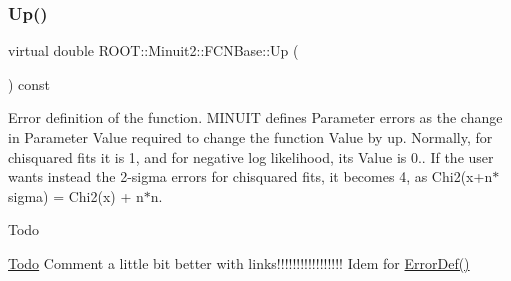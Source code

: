 \subsubsection{\texorpdfstring{Up()}{Up()}\hspace{0.1cm}{\footnotesize\ttfamily [1/3]}}
{\footnotesize\ttfamily virtual double R\+O\+O\+T\+::\+Minuit2\+::\+F\+C\+N\+Base\+::\+Up (\begin{DoxyParamCaption}{ }\end{DoxyParamCaption}) const\hspace{0.3cm}{\ttfamily [pure virtual]}}

Error definition of the function. M\+I\+N\+U\+IT defines Parameter errors as the change in Parameter Value required to change the function Value by up. Normally, for chisquared fits it is 1, and for negative log likelihood, its Value is 0.. If the user wants instead the 2-\/sigma errors for chisquared fits, it becomes 4, as Chi2(x+n$\ast$sigma) = Chi2(x) + n$\ast$n.

\begin{DoxyRefDesc}{Todo}
\item[\mbox{\hyperlink{todo__todo000001}{Todo}}]Comment a little bit better with links!!!!!!!!!!!!!!!!! Idem for \mbox{\hyperlink{classROOT_1_1Minuit2_1_1FCNBase_ac4592475c58a65b037ba97ab5f3cba10}{Error\+Def()}}\end{DoxyRefDesc}


